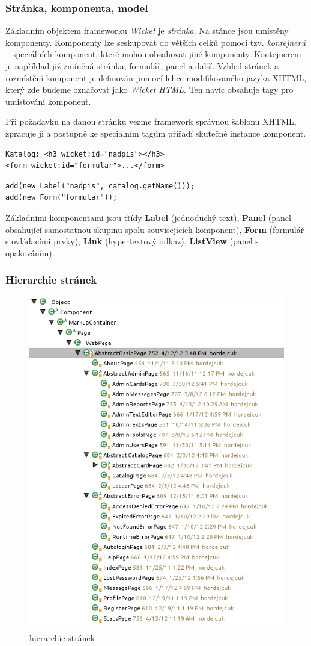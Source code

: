 \subsubsection{Stránka, komponenta, model}

Základním objektem frameworku {\em Wicket} je {\em stránka}. Na stánce jsou umístěny komponenty. Komponenty lze seskupovat do větších celků pomocí tzv. {\em kontejnerů} -- speciálních komponent, které mohou obsahovat jiné komponenty. Kontejnerem je například již zmíněná stránka, formulář, panel a další. Vzhled stránek a rozmístění komponent je definován pomocí lehce modifikovaného jazyka XHTML, který zde budeme označovat jako {\em Wicket HTML}. Ten navíc obsahuje tagy pro umisťování komponent.

Při požadavku na danou stránku vezme framework správnou šablonu XHTML, zpracuje ji a postupně ke speciálním tagům přiřadí skutečné instance komponent. 

\begin{verbatim}
Katalog: <h3 wicket:id="nadpis"></h3>
<form wicket:id="formular">...</form>
\end{verbatim}

\begin{verbatim}
add(new Label("nadpis", catalog.getName()));
add(new Form("formular"));
\end{verbatim}

Základními komponentami jsou třídy {\bf Label} (jednoduchý text), {\bf Panel} (panel obsahující samostatnou skupinu spolu souvisejících komponent), {\bf Form} (formulář s ovládacími prvky), {\bf Link} (hypertextový odkaz), {\bf ListView} (panel s opakováním). 

\subsubsection{Hierarchie stránek}

\begin{figure}
\label{fig:pages}
\centering
\includegraphics[width=.5\textwidth]{pages.png}
\caption{hierarchie stránek}
\end{figure}

